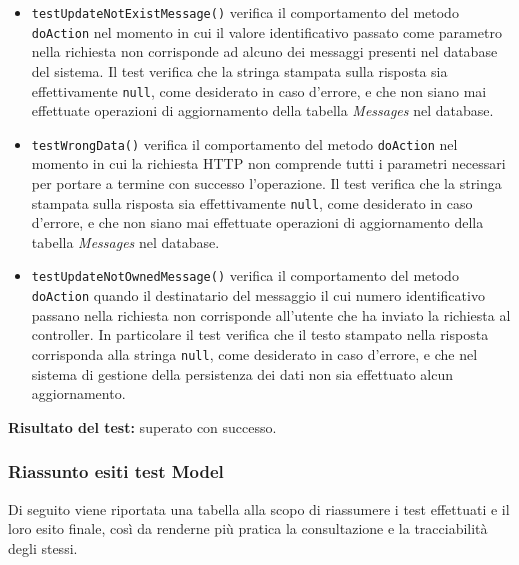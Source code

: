 \begin{itemize}
\begin{itemize}
\item \texttt{testUpdateNotExistMessage()} verifica il comportamento del metodo \texttt{doAction} nel momento in cui il valore identificativo passato come parametro nella richiesta non corrisponde ad alcuno dei messaggi presenti nel database del sistema. Il test verifica che la stringa stampata sulla risposta sia effettivamente \texttt{null}, come desiderato in caso d'errore, e che non siano mai effettuate operazioni di aggiornamento della tabella \textit{Messages} nel database.

\item \texttt{testWrongData()} verifica il comportamento del metodo \texttt{doAction} nel momento in cui la richiesta HTTP non comprende tutti i parametri necessari per portare a termine con successo l'operazione. Il test verifica che la stringa stampata sulla risposta sia effettivamente \texttt{null}, come desiderato in caso d'errore, e che non siano mai effettuate operazioni di aggiornamento della tabella \textit{Messages} nel database.

\item \texttt{testUpdateNotOwnedMessage()} verifica il comportamento del metodo \texttt{doAction} quando il destinatario del messaggio il cui numero identificativo passano nella richiesta non corrisponde all'utente che ha inviato la richiesta al controller. In particolare il test verifica che il testo stampato nella risposta corrisponda alla stringa \texttt{null}, come desiderato in caso d'errore, e che nel sistema di gestione della persistenza dei dati non sia effettuato alcun aggiornamento.

\end{itemize} 
\textbf{Risultato del test:} superato con successo.

\end{itemize}
\clearpage
\subsubsection{Riassunto esiti test Model}
Di seguito viene riportata una tabella alla scopo di riassumere i test effettuati e il loro esito finale, così da renderne più pratica la consultazione e la tracciabilità degli stessi.

